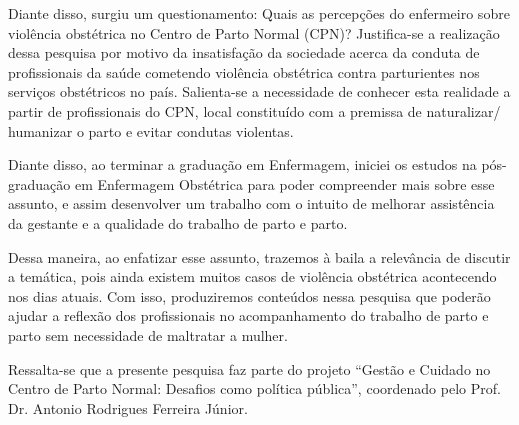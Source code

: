 Diante disso, surgiu um questionamento: Quais as percepções do enfermeiro sobre violência obstétrica no Centro de Parto Normal (CPN)? Justifica-se a realização dessa pesquisa por motivo da insatisfação da sociedade acerca da conduta de profissionais da saúde cometendo violência obstétrica contra parturientes nos serviços obstétricos no país. Salienta-se a necessidade de conhecer esta realidade a partir de profissionais do CPN, local constituído com a premissa de naturalizar/ humanizar o parto e evitar condutas violentas. 

Diante disso, ao terminar a graduação em Enfermagem, iniciei os estudos na pós-graduação em Enfermagem Obstétrica para poder compreender mais sobre esse assunto, e assim desenvolver um trabalho com o intuito de melhorar assistência da gestante e a qualidade do trabalho de parto e parto.

Dessa maneira, ao enfatizar esse assunto, trazemos à baila a relevância de discutir a temática, pois ainda existem muitos casos de violência obstétrica acontecendo nos dias atuais. Com isso, produziremos conteúdos nessa pesquisa que poderão ajudar a reflexão dos profissionais no acompanhamento do trabalho de parto e parto sem necessidade de maltratar a mulher. 

Ressalta-se que a presente pesquisa faz parte do projeto ``Gestão e Cuidado no Centro de Parto Normal: Desafios como política pública'', coordenado pelo Prof. Dr. Antonio Rodrigues Ferreira Júnior.
